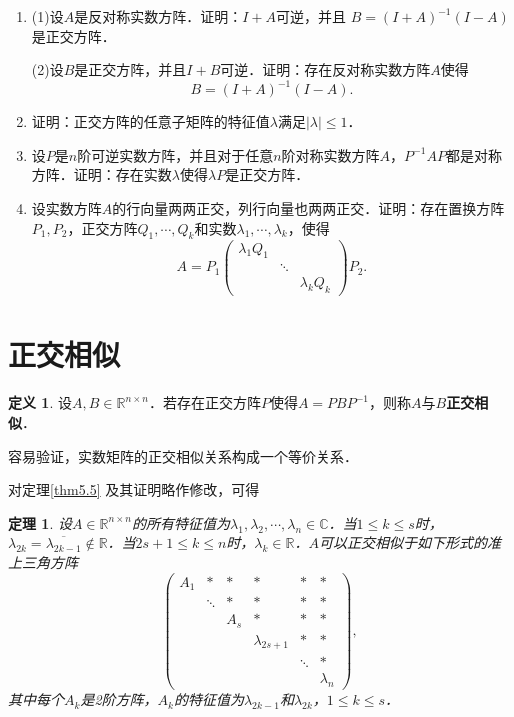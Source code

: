 \documentclass[a4paper,fontset=windows]{ctexbook}
\newtheorem{theorem}{定理}[chapter]
\theoremstyle{definition}
\newtheorem{definition}{定义}[chapter]
\renewcommand{\le}{\leqslant}
\begin{document}
\begin{enumerate}
\item (1)设$A$是反对称实数方阵．证明：$I+A$可逆，并且
$B=(I+A)^{-1}(I-A)$是正交方阵．

(2)设$B$是正交方阵，并且$I+B$可逆．证明：存在反对称实数方阵$A$使得
$$B=(I+A)^{-1}(I-A).$$

\item 证明：正交方阵的任意子矩阵的特征值$\lambda$满足$|\lambda|\le 1$．

\item 设$P$是$n$阶可逆实数方阵，并且对于任意$n$阶对称实数方阵$A$，$P^{-1}AP$都是对称方阵．\linebreak 证明：存在实数$\lambda$使得$\lambda P$是正交方阵．

\item 设实数方阵$A$的行向量两两正交，列行向量也两两正交．证明：存在置换方阵$P_1,P_2$，正交方阵$Q_1,\cdots,Q_k$和实数$\lambda_1,\cdots,\lambda_k$，使得
$$A=P_1\begin{pmatrix}\lambda_1Q_1&& \\ &\ddots& \\ &&\lambda_kQ_k\end{pmatrix}P_2.$$

\end{enumerate}

\clearpage\section{正交相似}

\begin{definition}
设$A,B\in\mathbb{R}^{n\times n}$．若存在正交方阵$P$使得$A=PBP^{-1}$，则称$A$与$B${\bf 正交相似}．
\end{definition}

容易验证，实数矩阵的正交相似关系构成一个等价关系．

\medskip 对定理\ref{thm5.5} 及其证明略作修改，可得

\begin{theorem}\label{thm6.5}
设$A\in\mathbb{R}^{n\times n}$的所有特征值为$\lambda_1,\lambda_2,\cdots,\lambda_n\in\mathbb{C}$．当$1\le k\le s$时，$\lambda_{2k}=\overline{\lambda_{2k-1}}\notin\mathbb{R}$．当$2s+1\le k\le n$时，$\lambda_k\in\mathbb{R}$．$A$可以正交相似于如下形式的准上三角方阵
\begin{equation}\label{eq6.2}
\begin{pmatrix}A_1&*&*&*&*&* \\ &\ddots&*&*&*&* \\ &&A_s&*&*&* \\ &&&\lambda_{2s+1}&*&* \\ &&&&\ddots&* \\ &&&&&\lambda_n\end{pmatrix},
\end{equation}
其中每个$A_k$是2阶方阵，$A_k$的特征值为$\lambda_{2k-1}$和$\lambda_{2k}$，$1\le k\le s$．
\end{theorem}
\end{document}

